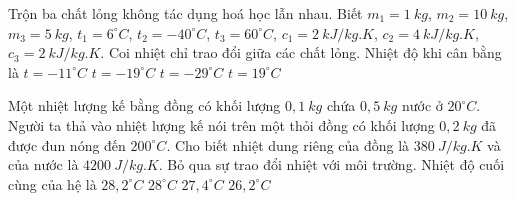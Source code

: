 \begin{ex}%
	Trộn ba chất lỏng không tác dụng hoá học lẫn nhau. Biết $m_1=1\ kg$, $m_2=10\ kg$, $m_3=5\ kg$, $t_1=6^{\circ}C$, $t_2=-40^{\circ}C$, $t_3=60^{\circ}C$, $c_1=2\ kJ/kg.K$, $c_2=4\ kJ/kg.K$, $c_3=2\ kJ/kg.K$. Coi nhiệt chỉ trao đổi giữa các chất lỏng. Nhiệt độ khi cân bằng là
	\choice
	{$t=-11^{\circ}C$}
	{\True $t=-19^{\circ}C$}
	{$t=-29^{\circ}C$}
	{$t=19^{\circ}C$}
	\end{ex}




\begin{ex} 
	Một nhiệt lượng kế bằng đồng có khối lượng $0,1 \ kg$ chứa $0,5 \ kg$ nước ở $20^\circ C$. Người ta thả vào nhiệt lượng kế nói trên một thỏi đồng có khối lượng $0,2 \ kg$ đã được đun nóng đến $200^\circ C$. Cho biết nhiệt dung riêng của đồng là $380 \ J /kg.K$ và của nước là $4200 \ J /kg.K$. Bỏ qua sự trao đổi nhiệt với môi trường. Nhiệt độ cuối cùng của hệ là
	\choice
	{$28,2^\circ C$}
	{$28^\circ C$}
	{$27,4^\circ C$}
	{\True $26,2^\circ C$}
\end{ex}






